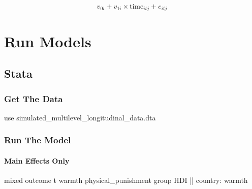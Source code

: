 \documentclass[
  letterpaper,
  DIV=11,
  numbers=noendperiod]{scrreprt}
\let\oldparagraph\paragraph
\renewcommand{\paragraph}[1]{\oldparagraph{#1}\mbox{}}
\newenvironment{Shaded}{\begin{snugshade}}{\end{snugshade}}
\newcommand{\FunctionTok}[1]{\textcolor[rgb]{0.28,0.35,0.67}{#1}}
\newcommand{\KeywordTok}[1]{\textcolor[rgb]{0.00,0.23,0.31}{#1}}
\newcommand{\NormalTok}[1]{\textcolor[rgb]{0.00,0.23,0.31}{#1}}
\begin{document}
\[v_{0i} + v_{1i} \times \text{time}_{itj} + e_{itj}\]

\section{Run Models}\label{run-models-2}

\subsection{Stata}

\subsubsection{Get The Data}\label{get-the-data-3}

\begin{Shaded}
\begin{Highlighting}[]

\KeywordTok{use}\NormalTok{ simulated\_multilevel\_longitudinal\_data.dta}
\end{Highlighting}
\end{Shaded}

\subsubsection{Run The Model}\label{run-the-model-3}

\paragraph{Main Effects Only}\label{main-effects-only}

\begin{Shaded}
\begin{Highlighting}[]

\NormalTok{mixed outcome t warmth physical\_punishment }\FunctionTok{group}\NormalTok{ HDI || country: warmth}
\end{Highlighting}
\end{Shaded}
\end{document}
